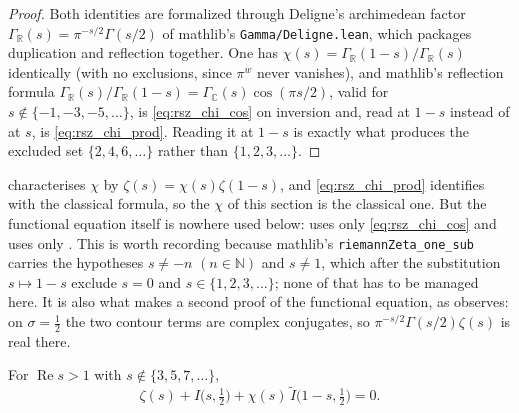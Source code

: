 \begin{proof}
Both identities are formalized through Deligne's archimedean factor
$\Gamma_{\mathbb{R}}(s)=\pi^{-s/2}\Gamma(s/2)$ of mathlib's \texttt{Gamma/Deligne.lean}, which
packages duplication and reflection together.  One has
$\chi(s)=\Gamma_{\mathbb{R}}(1-s)/\Gamma_{\mathbb{R}}(s)$ identically (with no exclusions,
since $\pi^{w}$ never vanishes), and mathlib's reflection formula
$\Gamma_{\mathbb{R}}(s)/\Gamma_{\mathbb{R}}(1-s)=\Gamma_{\mathbb{C}}(s)\cos(\pi s/2)$, valid
for $s\notin\{-1,-3,-5,\dots\}$, is \eqref{eq:rsz_chi_cos} on inversion and, read at $1-s$
instead of at $s$, is \eqref{eq:rsz_chi_prod}.  Reading it at $1-s$ is exactly what produces
the excluded set $\{2,4,6,\dots\}$ rather than $\{1,2,3,\dots\}$.
\end{proof}

\begin{remark}
\label{rem:rsz_chi_fe}
 characterises $\chi$ by $\zeta(s)=\chi(s)\zeta(1-s)$, and
\eqref{eq:rsz_chi_prod} identifies  with the classical formula, so the
$\chi$ of this section is the classical one.  But the functional equation itself is nowhere
used below:  uses only \eqref{eq:rsz_chi_cos} and
 uses only .  This is worth recording because
mathlib's \texttt{riemannZeta\_one\_sub} carries the hypotheses $s\ne-n$ $(n\in\mathbb{N})$
and $s\ne1$, which after the substitution $s\mapsto1-s$ exclude $s=0$ and
$s\in\{1,2,3,\dots\}$; none of that has to be managed here.  It is also what makes
 a second proof of the functional equation, as
\cite{Siegel1932} observes: on $\sigma=\tfrac12$ the two contour terms are complex
conjugates, so $\pi^{-s/2}\Gamma(s/2)\zeta(s)$ is real there.
\end{remark}

\begin{proposition}
\label{prop:rsz_general_half}
\leanok
{}
For $\operatorname{Re}s>1$ with $s\notin\{3,5,7,\dots\}$,
\[
  \zeta(s)+I\bigl(s,\tfrac12\bigr)+\chi(s)\,\widetilde I\bigl(1-s,\tfrac12\bigr)=0 .
\]
\end{proposition}

